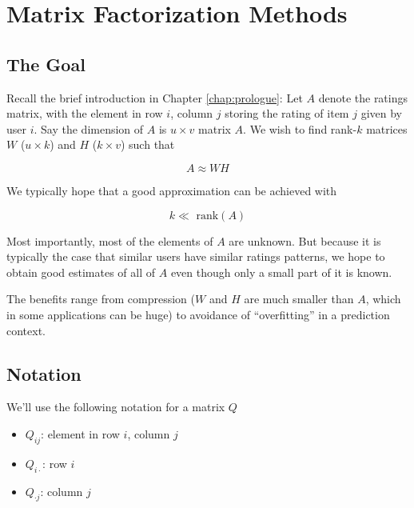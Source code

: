 \chapter{Matrix Factorization Methods}  
\label{chap:svd} 


\section{The Goal}

Recall the brief introduction in Chapter \ref{chap:prologue}:  Let $A$
denote the ratings matrix, with the element in row $i$, column $j$
storing the rating of item $j$ given by user $i$.  Say the dimension of
$A$ is $u \times v$ matrix $A$.  We wish to find rank-$k$ matrices $W$
($u \times k$) and $H$ ($k \times v$) such that

\begin{equation}
\label{awh}
A \approx W H
\end{equation}

We typically hope that a good approximation can be achieved with

\begin{equation}
k \ll \textrm{ rank}(A)
\end{equation}

Most importantly, most of the elements of $A$ are unknown.  But because
it is typically the case that similar users have similar ratings
patterns, we hope to obtain good estimates of all of $A$ even though
only a small part of it is known.










The benefits range from compression ($W$ and $H$ are much smaller than
$A$, which in some applications can be huge) to avoidance of
``overfitting'' in a prediction context.

\section{Notation}

We'll use the following notation for a matrix $Q$

\begin{itemize}

\item $Q_{ij}$:  element in row $i$, column $j$

\item $Q_{i \cdot}$:  row $i$

\item $Q_{\cdot j}$:  column $j$

\end{itemize}

